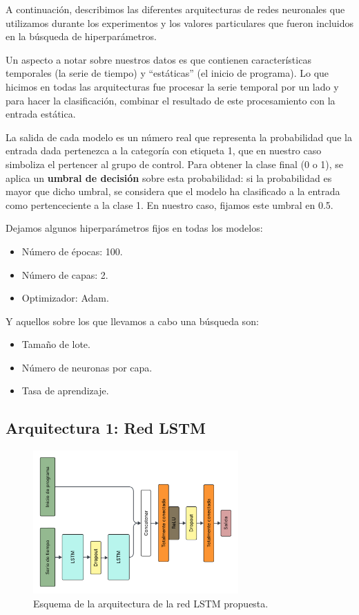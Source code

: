 \documentclass[../../main.tex]{subfiles}
\begin{document}
A continuación, describimos las diferentes arquitecturas de redes neuronales que
utilizamos durante los experimentos y los valores particulares que fueron incluidos en la
búsqueda de hiperparámetros.

Un aspecto a notar sobre nuestros datos es que contienen características temporales (la
serie de tiempo) y ``estáticas'' (el inicio de programa). Lo que hicimos en todas las
arquitecturas fue procesar la serie temporal por un lado y para hacer la clasificación,
combinar el resultado de este procesamiento con la entrada estática.

La salida de cada modelo es un número real que representa la probabilidad que la entrada
dada pertenezca a la categoría con etiqueta 1, que en nuestro caso simboliza el pertencer
al grupo de control. Para obtener la clase final (0 o 1),  se aplica un \textbf{umbral de
decisión} sobre esta probabilidad: si la probabilidad es mayor que dicho umbral, se
considera que el modelo ha clasificado a la entrada como pertenceciente a la clase 1. En
nuestro caso, fijamos este umbral en 0.5.

Dejamos algunos hiperparámetros fijos en todas los modelos:
\begin{itemize}[itemsep=0cm, topsep=0cm, parsep=0cm, partopsep=0cm]
    \item Número de épocas: 100.
    \item Número de capas: 2.
    \item Optimizador: Adam.
\end{itemize}

Y aquellos sobre los que llevamos a cabo una búsqueda son:
\begin{itemize}[itemsep=0cm, topsep=0cm, parsep=0cm, partopsep=0cm]
    \item Tamaño de lote.
    \item Número de neuronas por capa.
    \item Tasa de aprendizaje.
\end{itemize}

\subsection{Arquitectura 1: Red LSTM}
\begin{figure}[H]
    \centering
    \includegraphics[width=0.7\textwidth]{figs/lstm_v2.png}
    \caption{Esquema de la arquitectura de la red LSTM propuesta.}
    \label{fig:lstm_v2}
\end{figure}
\end{document}
